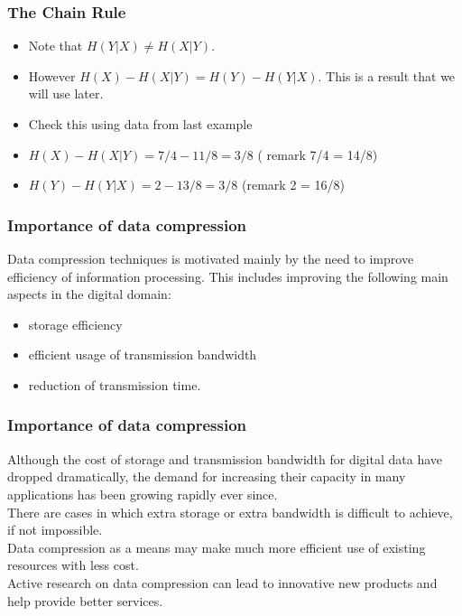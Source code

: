 

\begin{frame}

\frametitle{The Chain Rule}
\begin{itemize}
\item Note that $H(Y|X) \neq H(X|Y)$.
\item However $H(X) - H(X|Y) = H(Y) - H(Y|X)$. This is a result that we will use later.
\item Check this using data from last example
\item $H(X) - H(X|Y)  = 7/4 - 11/8 = 3/8$   ( remark 7/4 = 14/8)
\item $H(Y) - H(Y|X)  = 2 - 13/8 = 3/8$   (remark 2 = 16/8)
\end{itemize}
\end{frame}





\begin{frame}
\frametitle{Importance of data compression}
Data compression techniques is motivated mainly by the need to improve
efficiency of information processing. This includes improving the following
main aspects in the digital domain:
\begin{itemize} \item storage efficiency
	\item  efficient usage of transmission bandwidth
	\item reduction of transmission time. \end{itemize}
\end{frame}
\begin{frame}
\frametitle{Importance of data compression}
Although the cost of storage and transmission bandwidth for digital data
have dropped dramatically, the demand for increasing their capacity in many
applications has been growing rapidly ever since.\\ There are cases in which
extra storage or extra bandwidth is difficult to achieve, if not impossible.\\
Data compression as a means may make much more efficient use of existing
resources with less cost. \\ Active research on data compression can lead to
innovative new products and help provide better services.
\end{frame}
